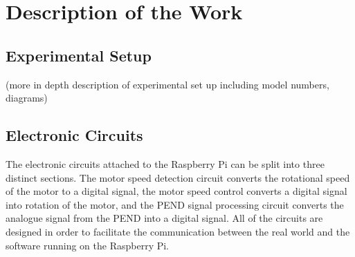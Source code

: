 \documentclass[a4]{report}
\begin{document}
	



	\chapter*{Description of the Work}



	\section{Experimental Setup}
	(more in depth description of experimental set up including model numbers, diagrams)



	\section{Electronic Circuits}
	The electronic circuits attached to the Raspberry Pi can be split into three distinct sections. The motor speed detection circuit converts the rotational speed of the motor to a digital signal, the motor speed control converts a digital signal into rotation of the motor, and the PEND signal processing circuit converts the analogue signal from the PEND into a digital signal. All of the circuits are designed in order to facilitate the communication between the real world and the software running on the Raspberry Pi. 
\end{document}
